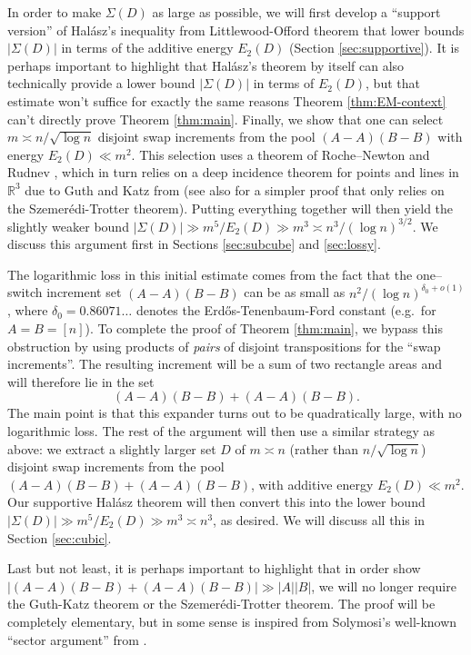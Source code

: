 \documentclass[12pt]{amsart}
\theoremstyle{definition}
\theoremstyle{remark}
\newcommand{\abs}[1]{\left|#1\right|}
\newcommand{\Sig}{\Sigma}
\begin{document}
In order to make $\Sig(D)$ as large as possible, we will first develop a
``support version'' of Hal\'asz's inequality from Littlewood-Offord theorem that lower bounds $\abs{\Sig(D)}$ in terms of the additive energy $E_2(D)$ (Section \ref{sec:supportive}). It is perhaps important to highlight that Hal\'asz's theorem by itself can also technically provide a lower bound $\abs{\Sig(D)}$ in terms of $E_{2}(D)$, but that estimate won't suffice for exactly the same reasons Theorem \ref{thm:EM-context} can't directly prove Theorem \ref{thm:main}. 
Finally, we show that one can select $m\asymp n/\sqrt{\log n}$ disjoint swap increments from the pool
$(A-A)(B-B)$ with energy $E_2(D)\ll m^2$. This selection uses a theorem of Roche--Newton and Rudnev \cite[Theorem 1']{RNR}, which in turn relies on a deep incidence theorem for points and lines in $\mathbb{R}^{3}$ due to Guth and Katz from \cite{GuthKatz15} (see also \cite{BloomWalker19} for a simpler proof that only relies on the Szemer\'edi-Trotter theorem). Putting everything together will then yield the slightly weaker bound $\abs{\Sig(D)}\gg m^{5} / E_{2}(D) \gg m^3 \asymp n^{3} / (\log n)^{3/2}$. We discuss this argument first in Sections \ref{sec:subcube} and \ref{sec:lossy}. 

The logarithmic loss in this initial estimate comes from the fact that the one--switch increment
set $(A-A)(B-B)$ can be as small as $n^2/(\log n)^{\delta_0+o(1)}$, where $\delta_0 = 0.86071\ldots$ denotes the Erd\H{o}s-Tenenbaum-Ford constant (e.g.\ for $A=B=[n]$).  To complete the proof of Theorem \ref{thm:main}, we bypass this obstruction by using products of {\it{pairs}} of disjoint transpositions for the ``swap increments''. The resulting increment will be a sum of two rectangle areas and will therefore lie
in the set
\[
(A-A)(B-B)+(A-A)(B-B).
\]
The main point is that this expander turns out to be quadratically large, with no logarithmic loss. The rest of the argument will then use a similar strategy as above: we extract a slightly larger set $D$ of $m \asymp n$ (rather than $n/\sqrt{\log n}$) disjoint swap increments from the pool
$(A-A)(B-B)+(A-A)(B-B)$, with additive energy $E_2(D)\ll m^2$. Our supportive Hal\'asz theorem will then convert this into the lower bound $\abs{\Sig(D)}\gg m^{5} / E_{2}(D) \gg m^3 \asymp n^{3}$, as desired. We will discuss all this in Section \ref{sec:cubic}. 

Last but not least, it is perhaps important to highlight that in order show $|(A-A)(B-B)+(A-A)(B-B)| \gg |A||B|$, we will no longer require the Guth-Katz theorem or the Szemer\'edi-Trotter theorem. The proof will be completely elementary, but in some sense is inspired from Solymosi's well-known ``sector argument'' from \cite{Solymosi09}.
\end{document}
